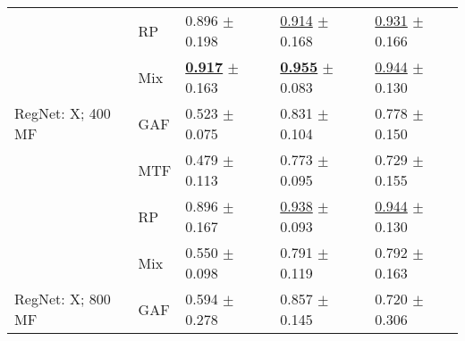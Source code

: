 \begin{tabular}{lllll}
 & RP & \textcolor[rgb]{0.0404411765,0.5000000000,0}{0.896} $\pm$ \textcolor[rgb]{0.7085309655,0.2914690345,0}{0.198} & \underline{\textcolor[rgb]{0.1367861886,0.5000000000,0}{0.914}} $\pm$ \textcolor[rgb]{0.6005700209,0.3994299791,0}{0.168} & \underline{\textcolor[rgb]{0.1217277487,0.5000000000,0}{0.931}} $\pm$ \textcolor[rgb]{0.3194008772,0.5000000000,0}{0.166} \\
 & Mix & \underline{\textbf{\textcolor[rgb]{0.0000000000,0.5000000000,0}{0.917}}} $\pm$ \textcolor[rgb]{0.5819876952,0.4180123048,0}{0.163} & \underline{\textbf{\textcolor[rgb]{0.0000000000,0.5000000000,0}{0.955}}} $\pm$ \textcolor[rgb]{0.1234823448,0.5000000000,0}{0.083} & \underline{\textcolor[rgb]{0.0785340314,0.5000000000,0}{0.944}} $\pm$ \textcolor[rgb]{0.1425478198,0.5000000000,0}{0.130} \\
RegNet: X; 400 MF & GAF & \textcolor[rgb]{0.7647058824,0.2352941176,0}{0.523} $\pm$ \textcolor[rgb]{0.2694079530,0.5000000000,0}{0.075} & \textcolor[rgb]{0.4152279770,0.5000000000,0}{0.831} $\pm$ \textcolor[rgb]{0.2410479020,0.5000000000,0}{0.104} & \textcolor[rgb]{0.5968586387,0.4031413613,0}{0.778} $\pm$ \textcolor[rgb]{0.2423763759,0.5000000000,0}{0.150} \\
 & MTF & \textcolor[rgb]{0.8492647059,0.1507352941,0}{0.479} $\pm$ \textcolor[rgb]{0.4041119296,0.5000000000,0}{0.113} & \textcolor[rgb]{0.6082337317,0.3917662683,0}{0.773} $\pm$ \textcolor[rgb]{0.1915429563,0.5000000000,0}{0.095} & \textcolor[rgb]{0.7480366492,0.2519633508,0}{0.729} $\pm$ \textcolor[rgb]{0.2675465965,0.5000000000,0}{0.155} \\
 & RP & \textcolor[rgb]{0.0404411765,0.5000000000,0}{0.896} $\pm$ \textcolor[rgb]{0.5973732826,0.4026267174,0}{0.167} & \underline{\textcolor[rgb]{0.0557768924,0.5000000000,0}{0.938}} $\pm$ \textcolor[rgb]{0.1771602221,0.5000000000,0}{0.093} & \underline{\textcolor[rgb]{0.0785340314,0.5000000000,0}{0.944}} $\pm$ \textcolor[rgb]{0.1425478198,0.5000000000,0}{0.130} \\
 & Mix & \textcolor[rgb]{0.7117647059,0.2882352941,0}{0.550} $\pm$ \textcolor[rgb]{0.3491926171,0.5000000000,0}{0.098} & \textcolor[rgb]{0.5482071713,0.4517928287,0}{0.791} $\pm$ \textcolor[rgb]{0.3220066784,0.5000000000,0}{0.119} & \textcolor[rgb]{0.5536649215,0.4463350785,0}{0.792} $\pm$ \textcolor[rgb]{0.3053798208,0.5000000000,0}{0.163} \\
RegNet: X; 800 MF & GAF & \textcolor[rgb]{0.6264705882,0.3735294118,0}{0.594} $\pm$ \textcolor[rgb]{0.9922278614,0.0077721386,0}{0.278} & \textcolor[rgb]{0.3266932271,0.5000000000,0}{0.857} $\pm$ \textcolor[rgb]{0.4722563182,0.5000000000,0}{0.145} & \textcolor[rgb]{0.7774869110,0.2225130890,0}{0.720} $\pm$ \textcolor[rgb]{1.0000000000,0.0000000000,0}{0.306} \\

\end{tabular}
